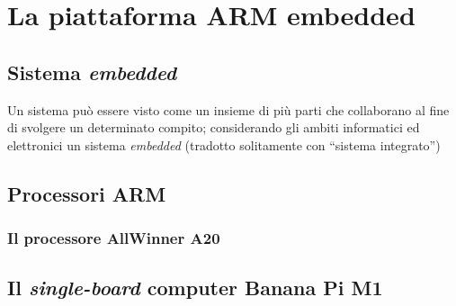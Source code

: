 
\chapter{La piattaforma ARM embedded} %

\label{Chapter5} %



\section{Sistema \emph{embedded}}

Un sistema può essere visto come un insieme di più parti che collaborano al fine
di svolgere un determinato compito; considerando gli  ambiti informatici ed 
elettronici un sistema \emph{embedded} (tradotto solitamente con ``sistema 
integrato'') 


\section{Processori ARM}


\subsection{Il processore AllWinner A20}


\section{Il \emph{single-board} computer Banana Pi M1}

